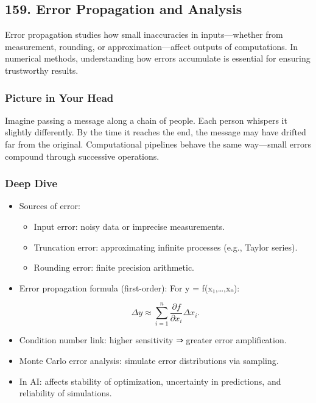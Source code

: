 \documentclass[
  letterpaper,
  DIV=11,
  numbers=noendperiod]{scrreprt}
\providecommand{\tightlist}{%
  \setlength{\itemsep}{0pt}\setlength{\parskip}{0pt}}
\begin{document}
\subsection{159. Error Propagation and
Analysis}\label{error-propagation-and-analysis}

Error propagation studies how small inaccuracies in inputs---whether
from measurement, rounding, or approximation---affect outputs of
computations. In numerical methods, understanding how errors accumulate
is essential for ensuring trustworthy results.

\subsubsection{Picture in Your Head}\label{picture-in-your-head-158}

Imagine passing a message along a chain of people. Each person whispers
it slightly differently. By the time it reaches the end, the message may
have drifted far from the original. Computational pipelines behave the
same way---small errors compound through successive operations.

\subsubsection{Deep Dive}\label{deep-dive-158}

\begin{itemize}
\item
  Sources of error:

  \begin{itemize}
  \tightlist
  \item
    Input error: noisy data or imprecise measurements.
  \item
    Truncation error: approximating infinite processes (e.g., Taylor
    series).
  \item
    Rounding error: finite precision arithmetic.
  \end{itemize}
\item
  Error propagation formula (first-order): For y = f(x₁,\ldots,xₙ):

  \[
  \Delta y \approx \sum_{i=1}^n \frac{\partial f}{\partial x_i} \Delta x_i.
  \]
\item
  Condition number link: higher sensitivity ⇒ greater error
  amplification.
\item
  Monte Carlo error analysis: simulate error distributions via sampling.
\item
  In AI: affects stability of optimization, uncertainty in predictions,
  and reliability of simulations.
\end{itemize}
\end{document}
